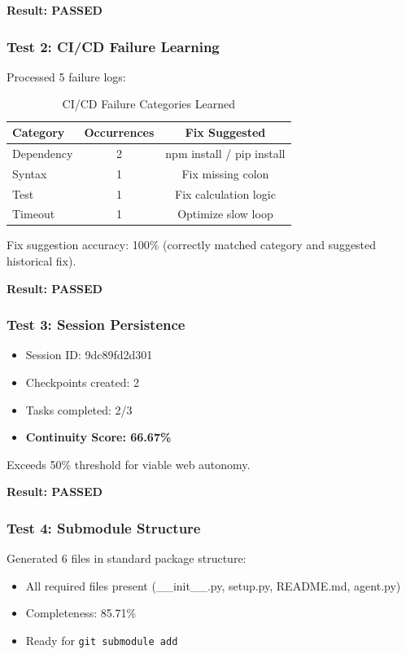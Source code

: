 \documentclass{article}
\begin{document}
\textbf{Result: PASSED}

\subsubsection{Test 2: CI/CD Failure Learning}

Processed 5 failure logs:
\begin{table}[h]
\centering
\begin{tabular}{lcc}
\toprule
Category & Occurrences & Fix Suggested \\
\midrule
Dependency & 2 & npm install / pip install \\
Syntax & 1 & Fix missing colon \\
Test & 1 & Fix calculation logic \\
Timeout & 1 & Optimize slow loop \\
\bottomrule
\end{tabular}
\caption{CI/CD Failure Categories Learned}
\end{table}

Fix suggestion accuracy: 100\% (correctly matched category and suggested historical fix).

\textbf{Result: PASSED}

\subsubsection{Test 3: Session Persistence}

\begin{itemize}
    \item Session ID: 9dc89fd2d301
    \item Checkpoints created: 2
    \item Tasks completed: 2/3
    \item \textbf{Continuity Score: 66.67\%}
\end{itemize}

Exceeds 50\% threshold for viable web autonomy.

\textbf{Result: PASSED}

\subsubsection{Test 4: Submodule Structure}

Generated 6 files in standard package structure:
\begin{itemize}
    \item All required files present (\_\_init\_\_.py, setup.py, README.md, agent.py)
    \item Completeness: 85.71\%
    \item Ready for \texttt{git submodule add}
\end{itemize}
\end{document}
